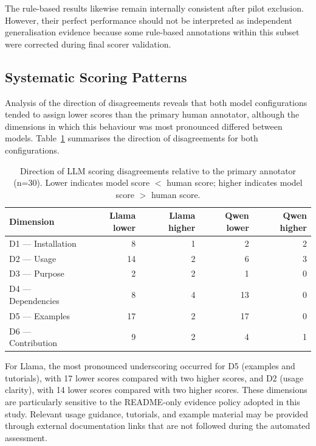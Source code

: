 The rule-based results likewise remain internally consistent after
pilot exclusion. However, their perfect performance should not be
interpreted as independent generalisation evidence because some
rule-based annotations within this subset were corrected during final
scorer validation.

\subsection{Systematic Scoring Patterns}
\label{sec:llm_systematic_patterns}

Analysis of the direction of disagreements reveals that both model
configurations tended to assign lower scores than the primary human
annotator, although the dimensions in which this behaviour was most
pronounced differed between models. Table~\ref{tab:llm_dir}
summarises the direction of disagreements for both configurations.

\begin{table}[htbp]
\centering
\caption{Direction of LLM scoring disagreements relative to the
primary annotator (n=30). Lower indicates model score $<$ human score;
higher indicates model score $>$ human score.}
\label{tab:llm_dir}
\small
\begin{tabular}{lrrrr}
\hline
\textbf{Dimension}
& \textbf{Llama lower}
& \textbf{Llama higher}
& \textbf{Qwen lower}
& \textbf{Qwen higher} \\
\hline
D1 --- Installation  & 8  & 1 & 2  & 2 \\
D2 --- Usage         & 14 & 2 & 6  & 3 \\
D3 --- Purpose       & 2  & 2 & 1  & 0 \\
D4 --- Dependencies  & 8  & 4 & 13 & 0 \\
D5 --- Examples      & 17 & 2 & 17 & 0 \\
D6 --- Contribution  & 9  & 2 & 4  & 1 \\
\hline
\end{tabular}
\end{table}

For Llama, the most pronounced underscoring occurred for D5
(examples and tutorials), with 17 lower scores compared with two
higher scores, and D2 (usage clarity), with 14 lower scores compared
with two higher scores. These dimensions are particularly sensitive
to the README-only evidence policy adopted in this study. Relevant
usage guidance, tutorials, and example material may be provided
through external documentation links that are not followed during
the automated assessment.

